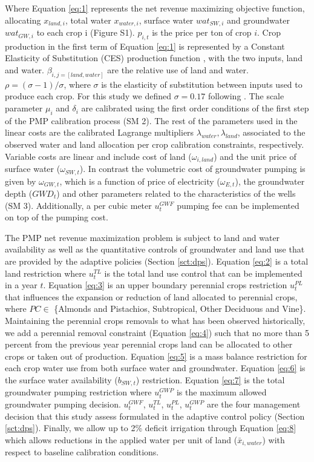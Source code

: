 \documentclass[a4paper,fleqn]{cas-sc}
\begin{document}
Where Equation \ref{eq:1} represents the net revenue maximizing objective function, allocating $x_{land,i}$, total water $x_{water,i}$, surface water $wat_{SW,i}$ and groundwater $wat_{GW,i}$ to each crop i (Figure S1). $p_{i,t}$ is the price per ton of crop $i$. Crop production in the first term of Equation \ref{eq:1} is represented by a Constant Elasticity of Substitution (CES) production function \citep{debertin_agricultural_2012,merel_fully_2010}, with the two inputs, land and water.  $\beta_{i,j=[land,water]}$ are the relative use of land and water. $\rho = (\sigma-1)/\sigma$, where $\sigma$ is the elasticity of substitution between inputs used to produce each crop. For this study we defined $\sigma = 0.17$ following \citet{howitt_calibrating_2012}. The scale parameter $\mu_{i}$ and $\delta_{i}$ are calibrated using the first order conditions of the first step of the PMP calibration process (SM 2). The rest of the parameters used in the linear costs are the calibrated Lagrange multipliers $\lambda_{water},\lambda_{land}$, associated to the observed water and land allocation per crop calibration constraints, respectively. Variable costs are linear and include cost of land ($\omega_{i,land}$) and the unit price of surface water ($\omega_{SW,t}$). In contrast the volumetric cost of groundwater pumping is given by $\omega_{GW,t}$, which is a function of price of electricity ($\omega_{E,t}$), the groundwater depth ($GWD_t$) and other parameters related to the characteristics of the wells (SM 3). Additionally, a per cubic meter $u^{GWF}_{t}$ pumping fee can be implemented on top of the pumping cost.

The PMP net revenue maximization problem is subject to land and water availability as well as the quantitative controls of groundwater and land use that are provided by the adaptive policies (Section \ref{sct:dps}). Equation \ref{eq:2} is a total land restriction where $u^{TL}_{t}$ is the total land use control that can be implemented in a year $t$. Equation \ref{eq:3} is an upper boundary perennial crops restriction $u^{PL}_{t}$ that influences the expansion or reduction of land allocated to perennial crops, where $PC \in$ \{Almonds and Pistachios, Subtropical, Other Deciduous and Vine\}. Maintaining the perennial crops removals to what has been observed historically, we add a perennial removal constraint (Equation \ref{eq:4}) such that no more than 5 percent from the previous year perennial crops land can be allocated to other crops or taken out of production. Equation \ref{eq:5} is a mass balance restriction for each crop water use from both surface water and groundwater. Equation \ref{eq:6} is the surface water availability ($b_{SW,t}$) restriction. Equation \ref{eq:7} is the total groundwater pumping restriction where $u^{GWP}_{t}$ is the maximum allowed groundwater pumping decision. $u^{GWF}_{t}$, $u^{TL}_{t}$, $u^{PL}_{t}$, $u^{GWP}_{t}$ are the four management decision that this study assess formulated in the adaptive control policy (Section \ref{sct:dps}).  Finally, we allow up to 2\% deficit irrigation through Equation \ref{eq:8} which allows reductions in the applied water per  unit of land ($\bar{x}_{i,water}$) with respect to baseline calibration conditions. 
\end{document}
